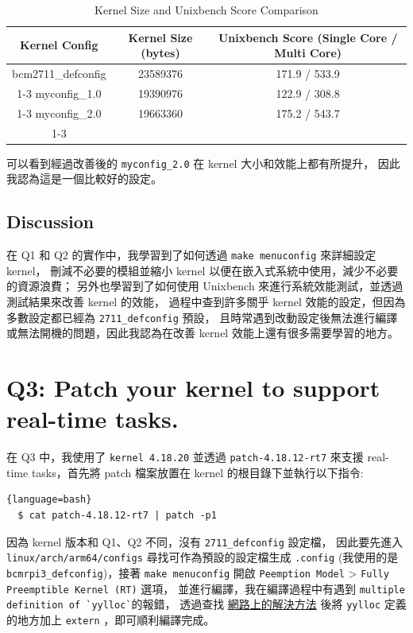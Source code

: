\documentclass[a4paper, oneside, final, 12pt]{scrartcl} %
\begin{document}
\begin{table}[ht]
  \centering
    \begin{tabular}{|*{3}{c|}}
        \hline
    Kernel Config    & Kernel Size (bytes)  & Unixbench Score (Single Core / Multi Core)  \\
        \hline
    bcm2711\_defconfig  &  23589376    &  171.9 / 533.9 \\  \cline{1-3}
    myconfig\_1.0       &  19390976    &  122.9 / 308.8 \\  \cline{1-3}
    myconfig\_2.0       &  19663360    &  175.2 / 543.7 \\  \cline{1-3}
        \hline
    \end{tabular}
  \caption{Kernel Size and Unixbench Score Comparison}
\end{table}

可以看到經過改善後的 \lstinline{myconfig_2.0} 在 kernel 大小和效能上都有所提升，
因此我認為這是一個比較好的設定。

\subsection{Discussion}

在 Q1 和 Q2 的實作中，我學習到了如何透過 \lstinline{make menuconfig} 來詳細設定 kernel，
刪減不必要的模組並縮小 kernel 以便在嵌入式系統中使用，減少不必要的資源浪費；
另外也學習到了如何使用 Unixbench 來進行系統效能測試，並透過測試結果來改善 kernel 的效能，
過程中查到許多關乎 kernel 效能的設定，但因為多數設定都已經為 \lstinline{2711_defconfig} 預設，
且時常遇到改動設定後無法進行編譯或無法開機的問題，因此我認為在改善 kernel 效能上還有很多需要學習的地方。

\section{Q3: Patch your kernel to support real-time tasks.}

在 Q3 中，我使用了 \lstinline{kernel 4.18.20} 並透過 \lstinline{patch-4.18.12-rt7} 
來支援 real-time tasks，首先將 patch 檔案放置在 kernel 的根目錄下並執行以下指令:

\begin{lstlisting}[firstnumber=1]{language=bash}
  $ cat patch-4.18.12-rt7 | patch -p1
\end{lstlisting}

因為 kernel 版本和 Q1、Q2 不同，沒有 \lstinline{2711_defconfig} 設定檔，
因此要先進入 \lstinline{linux/arch/arm64/configs} 尋找可作為預設的設定檔生成 \lstinline{.config}
(我使用的是 \lstinline{bcmrpi3_defconfig})，接著 \lstinline{make menuconfig} 開啟 
\lstinline{Peemption Model} > \lstinline{Fully Preemptible Kernel (RT)} 選項，
並進行編譯，我在編譯過程中有遇到 \lstinline{multiple definition of `yylloc`}的報錯，
透過查找 \href{https://blog.csdn.net/u011781073/article/details/123773085}{網路上的解決方法}
後將 \lstinline{yylloc} 定義的地方加上 \lstinline{extern} ，即可順利編譯完成。
\end{document}
